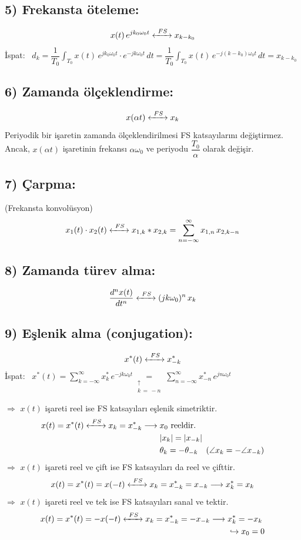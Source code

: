 \documentclass[11pt,a4paper]{article}
\begin{document}
\subsection{5) Frekansta öteleme:}
\[ x(t)\,e^{jk_0\omega_0 t} \xleftrightarrow{\ FS\ } x_{k-k_0} \]
İspat: \ $d_k = \dfrac{1}{T_0}\displaystyle\int_{T_0} x(t)\,e^{jk_0\omega_0 t}\cdot e^{-jk\omega_0 t}\,dt = \dfrac{1}{T_0}\displaystyle\int_{T_0} x(t)\,e^{-j(k - k_0)\omega_0 t}\,dt = x_{k-k_0}$

\subsection{6) Zamanda ölçeklendirme:}
\[ x(\alpha t) \xleftrightarrow{\ FS\ } x_k \]
Periyodik bir işaretin zamanda ölçeklendirilmesi FS katsayılarını değiştirmez. Ancak, $x(\alpha t)$ işaretinin frekansı $\alpha\omega_0$ ve periyodu $\dfrac{T_0}{\alpha}$ olarak değişir.

\subsection{7) Çarpma:}
(Frekansta konvolüsyon)
\[ x_1(t)\cdot x_2(t) \xleftrightarrow{\ FS\ } x_{1,k} \ast x_{2,k} = \sum_{n=-\infty}^{\infty} x_{1,n}\,x_{2,k-n} \]

\subsection{8) Zamanda türev alma:}
\[ \frac{d^n x(t)}{dt^n} \xleftrightarrow{\ FS\ } (jk\omega_0)^n\,x_k \]

\subsection{9) Eşlenik alma (conjugation):}
\[ x^{*}(t) \xleftrightarrow{\ FS\ } x_{-k}^{*} \]
İspat: \ $x^{*}(t) = \displaystyle\sum_{k=-\infty}^{\infty} x_k^{*}\,e^{-jk\omega_0 t} \underset{\substack{\uparrow\\ k\,=\,-n}}{=} \sum_{n=-\infty}^{\infty} x_{-n}^{*}\,e^{jn\omega_0 t}$

$\Rightarrow$ $x(t)$ işareti reel ise FS katsayıları eşlenik simetriktir.
\[ x(t) = x^{*}(t) \xleftrightarrow{\ FS\ } x_k = x_{-k}^{*} \longrightarrow \begin{aligned}[t] & x_0 \text{ reeldir.} \\ & |x_k| = |x_{-k}| \\ & \theta_k = -\theta_{-k} \quad (\angle x_k = -\angle x_{-k}) \end{aligned} \]
$\Rightarrow$ $x(t)$ işareti reel ve çift ise FS katsayıları da reel ve çifttir.
\[ x(t) = x^{*}(t) = x(-t) \xleftrightarrow{\ FS\ } x_k = x_{-k}^{*} = x_{-k} \longrightarrow x_k^{*} = x_k \]
$\Rightarrow$ $x(t)$ işareti reel ve tek ise FS katsayıları sanal ve tektir.
\[ x(t) = x^{*}(t) = -x(-t) \xleftrightarrow{\ FS\ } x_k = x_{-k}^{*} = -x_{-k} \longrightarrow \begin{aligned}[t] & x_k^{*} = -x_k \\ & \hookrightarrow x_0 = 0 \end{aligned} \]
\end{document}
